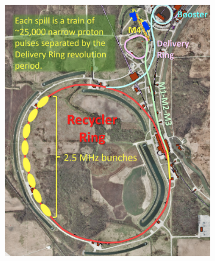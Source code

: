 \begin{figure}[!h]
     \begin{subfigure}[b]{0.4\linewidth}
         \centering
         \includegraphics[scale = 0.3]{figures/png/Screenshot_20240301_151449.png}
         \label{fig:accell}
     \end{subfigure}
     \begin{subfigure}[b]{0.7\linewidth}
         \centering

\end{subfigure}
\end{figure}
